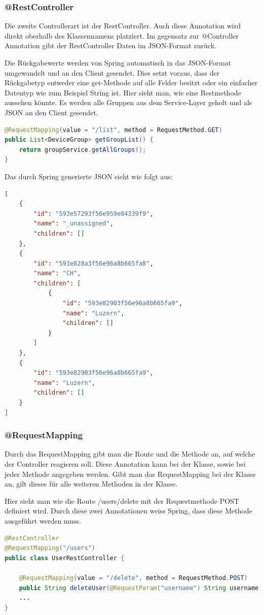 \subsubsection{@RestController}
Die zweite Controllerart ist der RestController. Auch diese Annotation wird direkt oberhalb des Klassennamens platziert. Im gegensatz zur @Controller Annotation gibt der RestController Daten im JSON-Format zurück. 

Die Rückgabewerte werden von Spring automatisch in das JSON-Format umgewandelt und an den Client gesendet. Dies setzt voraus, dass der Rückgabetyp entweder eine get-Methode auf alle Felder besitzt oder ein einfacher Datentyp wie zum Beispiel String ist.
Hier sieht man, wie eine Restmethode aussehen könnte. Es werden alle Gruppen aus dem Service-Layer geholt und als JSON an den Client gesendet.
\begin{lstlisting}[language=java]
@RequestMapping(value = "/list", method = RequestMethod.GET)
public List<DeviceGroup> getGroupList() {
	return groupService.getAllGroups();
}
\end{lstlisting}

Das durch Spring generierte JSON sieht wie folgt aus:
\begin{lstlisting}[language=json]
[
    {
        "id": "593e57293f56e959e84339f9",
        "name": "_unassigned",
        "children": []
    },
    {
        "id": "593e828a3f56e96a8b665fa8",
        "name": "CH",
        "children": [
            {
                "id": "593e82903f56e96a8b665fa9",
                "name": "Luzern",
                "children": []
            }
        ]
    },
    {
        "id": "593e82903f56e96a8b665fa9",
        "name": "Luzern",
        "children": []
    }
]
\end{lstlisting}

\subsubsection{@RequestMapping}
Durch das RequestMapping gibt man die Route und die Methode an, auf welche der Controller reagieren soll. Diese Annotation kann bei der Klasse, sowie bei jeder Methode angegeben werden. Gibt man das RequestMapping bei der Klasse an, gilt dieses für alle weiteren Methoden in der Klasse.

Hier sieht man wie die Route /users/delete mit der Requestmethode POST definiert wird. Durch diese zwei Annotationen weiss Spring, dass diese Methode ausgeführt werden muss.
\begin{lstlisting}[language=java]
@RestController
@RequestMapping("/users")
public class UserRestController {

	@RequestMapping(value = "/delete", method = RequestMethod.POST)
	public String deleteUser(@RequestParam("username") String username) {}
	...
}
\end{lstlisting}
